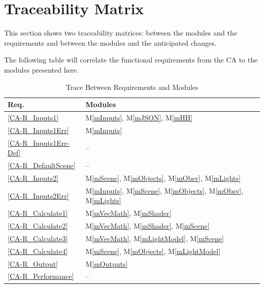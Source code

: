 \documentclass[12pt, titlepage]{article}
\newcommand{\mref}[1]{M\ref{#1}}
\begin{document}
\section{Traceability Matrix} \label{SecTM}

This section shows two traceability matrices: between the modules and the
requirements and between the modules and the anticipated changes.

The following table will correlate the functional requirements from the CA to 
the modules presented here.
\begin{table}[H]
\centering
\begin{tabular}{p{} p{}}
\toprule
\textbf{Req.} & \textbf{Modules}\\
\midrule
\ref{CA-R_Inputs1} & \mref{mInputs}, \mref{mJSON}, \mref{mHH}\\
\ref{CA-R_Inputs1Err} & \mref{mInputs}\\
\ref{CA-R_Inputs1Err-Def} & -- \\
\ref{CA-R_DefaultScene} & -- \\
\ref{CA-R_Inputs2} & \mref{mScene}, \mref{mObjects}, \mref{mObsv}, 
\mref{mLights}\\
\ref{CA-R_Inputs2Err} & \mref{mInputs}, \mref{mScene}, \mref{mObjects}, 
\mref{mObsv}, \mref{mLights}\\
\ref{CA-R_Calculate1} & \mref{mVecMath}, \mref{mShader}\\
\ref{CA-R_Calculate2} & \mref{mVecMath}, \mref{mShader},  
\mref{mScene}\\
\ref{CA-R_Calculate3} & \mref{mVecMath}, \mref{mLightModel}, \mref{mScene}\\
\ref{CA-R_Calculate4} & \mref{mScene}, \mref{mObjects}, \mref{mLightModel}\\
\ref{CA-R_Output} & \mref{mOutputs}\\
\ref{CA-R_Performance} & -- \\
\bottomrule
\end{tabular}
\caption{Trace Between Requirements and Modules}
\label{TblRT}
\end{table}
\end{document}
